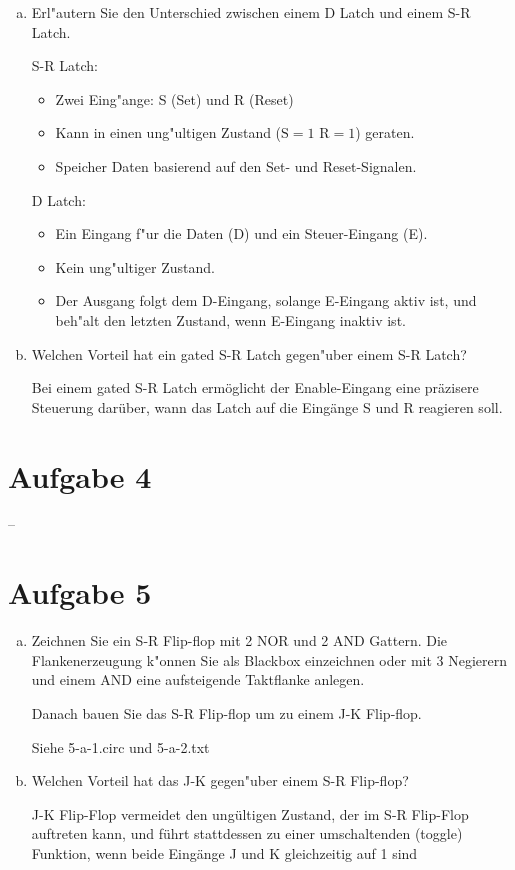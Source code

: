 \documentclass[10pt, oneside]{article}
\begin{document}
\begin{enumerate}[(a)]
    \item Erl"autern Sie den Unterschied zwischen einem D Latch und einem S-R Latch.

        S-R Latch:
        \begin{itemize}[$\rightarrow$]
            \item Zwei Eing"ange: S (Set) und R (Reset)
            \item Kann in einen ung"ultigen Zustand ($\text{S} = 1$ $\text{R} = 1$) geraten.
            \item Speicher Daten basierend auf den Set- und Reset-Signalen.
        \end{itemize}

        D Latch:
        \begin{itemize}[$\rightarrow$]
            \item Ein Eingang f"ur die Daten (D) und ein Steuer-Eingang (E).
            \item Kein ung"ultiger Zustand.
            \item Der Ausgang folgt dem D-Eingang, solange E-Eingang aktiv ist,
                und beh"alt den letzten Zustand, wenn E-Eingang inaktiv ist.
        \end{itemize}

    \item Welchen Vorteil hat ein gated S-R Latch gegen"uber einem S-R Latch?

        Bei einem gated S-R Latch ermöglicht der Enable-Eingang eine präzisere Steuerung darüber, wann
        das Latch auf die Eingänge S und R reagieren soll.
\end{enumerate}

\section{Aufgabe 4}

--

\section{Aufgabe 5}
\begin{enumerate}[(a)]
    \item Zeichnen Sie ein S-R Flip-flop mit 2 NOR und 2 AND Gattern. Die
        Flankenerzeugung k"onnen Sie als Blackbox einzeichnen oder mit 3
        Negierern und einem AND eine aufsteigende Taktflanke anlegen.

        Danach bauen Sie das S-R Flip-flop um zu einem J-K Flip-flop.

        Siehe 5-a-1.circ und 5-a-2.txt

    \item Welchen Vorteil hat das J-K gegen"uber einem S-R Flip-flop?

        J-K Flip-Flop vermeidet den ungültigen Zustand, der im S-R Flip-Flop
        auftreten kann, und führt stattdessen zu einer umschaltenden (toggle)
        Funktion, wenn beide Eingänge J und K gleichzeitig auf 1 sind
\end{enumerate}
\end{document}
